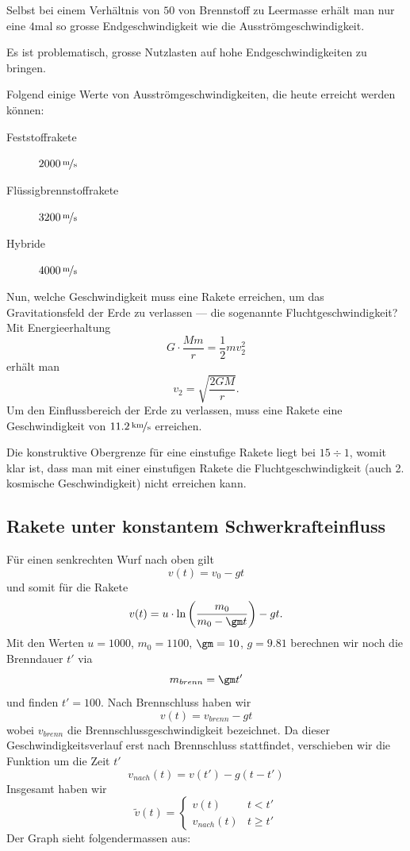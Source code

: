 \documentclass[%
draft,
11pt,%
twoside,%
titlepage,%
german,%
headsepline%
]{scrartcl}
\begin{document}
Selbst bei einem Verh\"altnis von $50$ von Brennstoff zu Leermasse erh\"alt man nur eine $4$mal so grosse Endgeschwindigkeit wie die Ausstr\"omgeschwindigkeit.

\begin{bem}
Es ist problematisch, grosse Nutzlasten auf hohe Endgeschwindigkeiten zu bringen.
\end{bem}

Folgend einige Werte von Ausstr\"omgeschwindigkeiten, die heute erreicht werden k\"onnen:
\begin{description}
\item[Feststoffrakete] $\unitfrac[2000]{m}{s}$
\item[Fl\"ussigbrennstoffrakete] $\unitfrac[3200]{m}{s}$
\item[Hybride] $\unitfrac[4000]{m}{s}$
\end{description}

Nun, welche Geschwindigkeit muss eine Rakete erreichen, um das Gravitationsfeld der Erde zu verlassen --- die sogenannte Fluchtgeschwindigkeit? Mit Energieerhaltung
$$G\cdot\frac{Mm}{r}=\frac{1}{2}mv_2^2$$
erh\"alt man
$$v_2=\sqrt{\frac{2GM}{r}}.$$
Um den Einflussbereich der Erde zu verlassen, muss eine Rakete eine Geschwindigkeit von $\unitfrac[11.2]{km}{s}$ erreichen.

\begin{bem}
Die konstruktive Obergrenze f\"ur eine einstufige Rakete liegt bei $15\div1$, womit klar ist, dass man mit einer einstufigen Rakete die Fluchtgeschwindigkeit (auch 2. kosmische Geschwindigkeit) nicht erreichen kann.
\end{bem}

\subsection{Rakete unter konstantem Schwerkrafteinfluss}

F\"ur einen senkrechten Wurf nach oben gilt
$$v(t)=v_0-gt$$
und somit f\"ur die Rakete
$$v(t)=u\cdot\ln\left(\frac{m_0}{m_0-\gm t}\right)-gt.$$
Mit den Werten $u=1000$, $m_0=1100$, $\gm=10$, $g=9.81$ berechnen wir noch die Brenndauer $t'$ via
$$m_{brenn}=\gm t'$$
und finden $t'=100$.
Nach Brennschluss haben wir
$$v(t)=v_{brenn}-gt$$
wobei $v_{brenn}$ die Brennschlussgeschwindigkeit bezeichnet. Da dieser Geschwindigkeitsverlauf erst nach Brennschluss stattfindet, verschieben wir die Funktion um die Zeit $t'$
$$v_{nach}(t)=v(t')-g(t-t')$$
Insgesamt haben wir
$$\tilde{v}(t)=
\begin{cases}
v(t)& t<t'\\
v_{nach}(t)& t\geq t'
\end{cases}
$$
Der Graph sieht folgendermassen aus:
\end{document}
